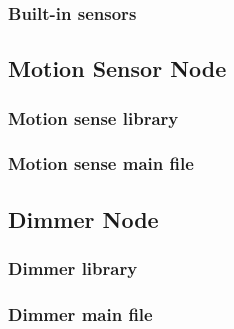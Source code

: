 \subsubsection{Built-in sensors}



\pagebreak


\subsection{Motion Sensor Node}
\label{an:motion-code}

\subsubsection{Motion sense library}



\subsubsection{Motion sense main file}


\pagebreak

\subsection{Dimmer Node}
\label{an:dimmer-code}

\subsubsection{Dimmer library}



\subsubsection{Dimmer main file}


